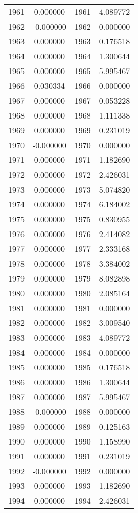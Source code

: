 \documentclass[12pt]{article}
\begin{document}
\begin{longtable}{@{}cccc@{}}
1961 & 0.000000 & 1961 & 4.089772 \\
1962 & -0.000000 & 1962 & 0.000000 \\
1963 & 0.000000 & 1963 & 0.176518 \\
1964 & 0.000000 & 1964 & 1.300644 \\
1965 & 0.000000 & 1965 & 5.995467 \\
1966 & 0.030334 & 1966 & 0.000000 \\
1967 & 0.000000 & 1967 & 0.053228 \\
1968 & 0.000000 & 1968 & 1.111338 \\
1969 & 0.000000 & 1969 & 0.231019 \\
1970 & -0.000000 & 1970 & 0.000000 \\
1971 & 0.000000 & 1971 & 1.182690 \\
1972 & 0.000000 & 1972 & 2.426031 \\
1973 & 0.000000 & 1973 & 5.074820 \\
1974 & 0.000000 & 1974 & 6.184002 \\
1975 & 0.000000 & 1975 & 0.830955 \\
1976 & 0.000000 & 1976 & 2.414082 \\
1977 & 0.000000 & 1977 & 2.333168 \\
1978 & 0.000000 & 1978 & 3.384002 \\
1979 & 0.000000 & 1979 & 8.082898 \\
1980 & 0.000000 & 1980 & 2.085164 \\
1981 & 0.000000 & 1981 & 0.000000 \\
1982 & 0.000000 & 1982 & 3.009540 \\
1983 & 0.000000 & 1983 & 4.089772 \\
1984 & 0.000000 & 1984 & 0.000000 \\
1985 & 0.000000 & 1985 & 0.176518 \\
1986 & 0.000000 & 1986 & 1.300644 \\
1987 & 0.000000 & 1987 & 5.995467 \\
1988 & -0.000000 & 1988 & 0.000000 \\
1989 & 0.000000 & 1989 & 0.125163 \\
1990 & 0.000000 & 1990 & 1.158990 \\
1991 & 0.000000 & 1991 & 0.231019 \\
1992 & -0.000000 & 1992 & 0.000000 \\
1993 & 0.000000 & 1993 & 1.182690 \\
1994 & 0.000000 & 1994 & 2.426031 \\

\end{longtable}
\end{document}
